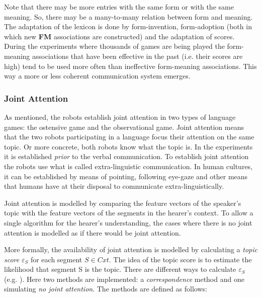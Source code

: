 Note that there may be more entries with the same form or with the same meaning. So, there may be a many-to-many relation between form and meaning. The adaptation of the lexicon is done by form-invention, form-adoption (both in which new {\bf FM} associations are constructed) and the adaptation of scores. During the experiments where thousands of games are being played the form-meaning associations that have been effective in the past (i.e. their scores are high) tend to be used more often than ineffective form-meaning associations. This way a more or less coherent communication system emerges.

\subsubsection{Joint Attention}

As mentioned, the robots establish joint attention in two types of language games: the ostensive game and the observational game. Joint attention means that the two robots participating in a language focus their attention on the same topic. Or more concrete, both robots know what the topic is. In the experiments it is established {\em prior} to the verbal communication. To establish joint attention the robots use what is called extra-linguistic communication. In human cultures, it can be established by means of pointing, following eye-gaze and other means that humans have at their disposal to communicate extra-linguistically.


Joint attention is modelled by comparing the feature vectors of the speaker's topic with the feature vectors of the segments in the hearer's context. To allow a single algorithm for the hearer's understanding, the cases where there is no joint attention is modelled as if there would be joint attention. 

More formally, the availability of joint attention is modelled by calculating a {\em topic score} $\varepsilon_S$ for each segment $S \in Cxt$. The idea of the topic score is to estimate the likelihood that segment S is the topic. There are different ways to calculate $\varepsilon_S$ (e.g. \citep{vogt:1998c}). Here two methods are implemented: a {\em correspondence} method and one simulating {\em no joint attention}. The methods are defined as follows:

